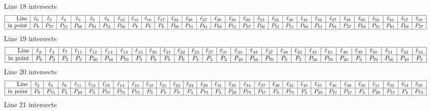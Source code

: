 \documentclass{article}
\begin{document}
{$$$$
Line 18 intersects 
$$
\begin{array}{|r*{28}{|c}|}
\hline
\mbox{Line}  & \ell_{0} & \ell_{3} & \ell_{4} & \ell_{5} & \ell_{6} & \ell_{8} & \ell_{13} & \ell_{15} & \ell_{16} & \ell_{17} & \ell_{22} & \ell_{26} & \ell_{27} & \ell_{28} & \ell_{29} & \ell_{30} & \ell_{33} & \ell_{35} & \ell_{40} & \ell_{42} & \ell_{44} & \ell_{47} & \ell_{48} & \ell_{50} & \ell_{53} & \ell_{55} & \ell_{57} & \ell_{59}\\
\hline
\mbox{in point}  & P_{8} & P_{37} & P_{51} & P_{66} & P_{81} & P_{51} & P_{66} & P_{8} & P_{8} & P_{8} & P_{66} & P_{51} & P_{81} & P_{66} & P_{51} & P_{37} & P_{66} & P_{51} & P_{51} & P_{66} & P_{51} & P_{81} & P_{37} & P_{66} & P_{51} & P_{81} & P_{66} & P_{37}\\
\hline
\end{array}
$$
Line 19 intersects 
$$
\begin{array}{|r*{27}{|c}|}
\hline
\mbox{Line}  & \ell_{2} & \ell_{3} & \ell_{7} & \ell_{11} & \ell_{12} & \ell_{13} & \ell_{14} & \ell_{15} & \ell_{20} & \ell_{21} & \ell_{22} & \ell_{23} & \ell_{27} & \ell_{31} & \ell_{33} & \ell_{34} & \ell_{37} & \ell_{38} & \ell_{42} & \ell_{43} & \ell_{45} & \ell_{46} & \ell_{49} & \ell_{50} & \ell_{51} & \ell_{52} & \ell_{53}\\
\hline
\mbox{in point}  & P_{9} & P_{3} & P_{3} & P_{3} & P_{40} & P_{56} & P_{70} & P_{3} & P_{9} & P_{9} & P_{9} & P_{3} & P_{3} & P_{3} & P_{40} & P_{56} & P_{70} & P_{3} & P_{3} & P_{56} & P_{70} & P_{40} & P_{3} & P_{70} & P_{56} & P_{40} & P_{3}\\
\hline
\end{array}
$$
Line 20 intersects 
$$
\begin{array}{|r*{28}{|c}|}
\hline
\mbox{Line}  & \ell_{2} & \ell_{6} & \ell_{8} & \ell_{11} & \ell_{12} & \ell_{13} & \ell_{14} & \ell_{16} & \ell_{19} & \ell_{21} & \ell_{22} & \ell_{24} & \ell_{29} & \ell_{31} & \ell_{33} & \ell_{34} & \ell_{37} & \ell_{39} & \ell_{42} & \ell_{43} & \ell_{45} & \ell_{46} & \ell_{49} & \ell_{50} & \ell_{51} & \ell_{52} & \ell_{54} & \ell_{59}\\
\hline
\mbox{in point}  & P_{9} & P_{75} & P_{4} & P_{29} & P_{4} & P_{57} & P_{75} & P_{75} & P_{9} & P_{9} & P_{9} & P_{4} & P_{75} & P_{4} & P_{29} & P_{75} & P_{57} & P_{4} & P_{75} & P_{4} & P_{29} & P_{57} & P_{57} & P_{4} & P_{29} & P_{75} & P_{4} & P_{75}\\
\hline
\end{array}
$$
Line 21 intersects 
$$
\begin{array}{|r*{28}{|c}|}

\end{array}$$}
\end{document}
